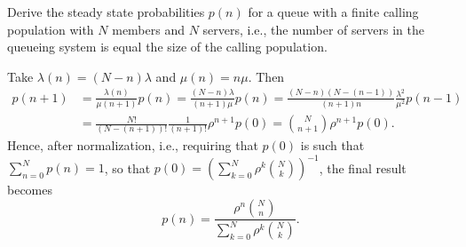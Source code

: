 \begin{exercise}  Derive the steady state probabilities $p(n)$ for a queue with
    a finite calling population with $N$ members and $N$ servers,
    i.e., the number of servers in the queueing system is equal the
    size of the calling population.
    \begin{solution}
  Take $\lambda(n) = (N-n)\lambda$ and $\mu(n) = n \mu$. Then 
    \begin{align*}
      p(n+1) 
&= \frac{\lambda(n)}{\mu(n+1)} p(n) 
= \frac{(N-n)\lambda}{(n+1)\mu} p(n) 
= \frac{(N-n)(N-(n-1))}{(n+1)n}\frac{\lambda^2}{\mu^2} p(n-1) \\
&= \frac{N!}{(N-(n+1))!}\frac1{(n+1)!}\rho^{n+1} p(0) 
  = {N \choose n+1}\rho^{n+1} p(0).
    \end{align*}
    Hence, after normalization, i.e., requiring that $p(0)$ is such
    that $\sum_{n=0}^N p(n) = 1$, so that $p(0) = \left(\sum_{k=0}^N \rho^k { N \choose k} \right)^{-1}$, the final result becomes
\begin{equation*}
  p(n) = \frac{\rho^n {N \choose n}}{\sum_{k=0}^N \rho^k {N \choose k}}.
\end{equation*}
    \end{solution}
\end{exercise}


